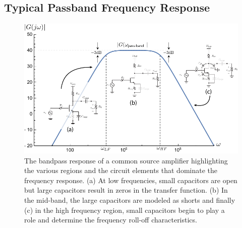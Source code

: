 \subsection{Typical Passband Frequency Response}
\begin{figure}[tb]
\begin{center}
\includegraphics[width=.95\columnwidth]{amp_bandpass_decorate} 
\end{center}
\caption{The bandpass response of a common source amplifier highlighting the various regions and the circuit elements that dominate the frequency response.  (a) At low frequencies, small capacitors are open but large capacitors result in zeros in the transfer function.  (b) In the mid-band, the large capacitors are modeled as shorts and finally (c) in the high frequency region, small capacitors begin to play a role and determine the frequency roll-off characteristics.}
\label{fig:amp_bandpass}
\end{figure}

